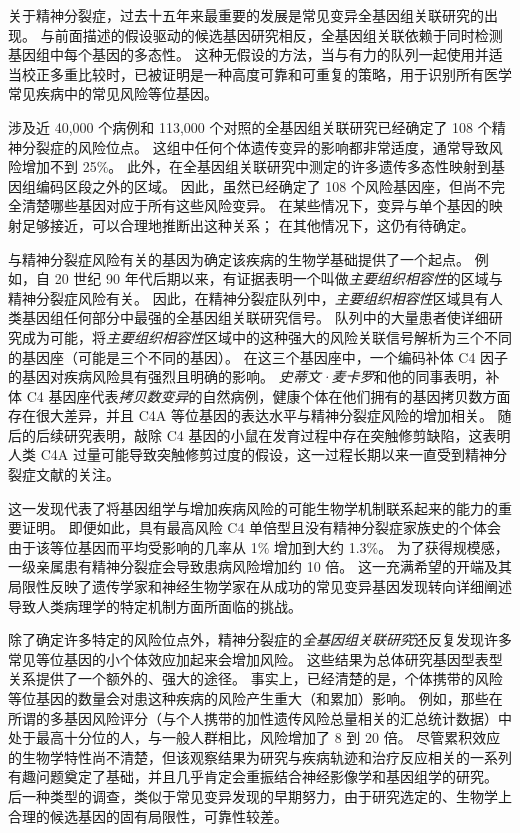 关于精神分裂症，过去十五年来最重要的发展是常见变异全基因组关联研究的出现。
与前面描述的假设驱动的候选基因研究相反，全基因组关联依赖于同时检测基因组中每个基因的多态性。
这种无假设的方法，当与有力的队列一起使用并适当校正多重比较时，已被证明是一种高度可靠和可重复的策略，用于识别所有医学常见疾病中的常见风险等位基因。


涉及近 40,000 个病例和 113,000 个对照的全基因组关联研究已经确定了 108 个精神分裂症的风险位点。 
这组中任何个体遗传变异的影响都非常适度，通常导致风险增加不到 25\%。
此外，在全基因组关联研究中测定的许多遗传多态性映射到基因组编码区段之外的区域。
因此，虽然已经确定了 108 个风险基因座，但尚不完全清楚哪些基因对应于所有这些风险变异。
在某些情况下，变异与单个基因的映射足够接近，可以合理地推断出这种关系；
在其他情况下，这仍有待确定。


与精神分裂症风险有关的基因为确定该疾病的生物学基础提供了一个起点。
例如，自 20 世纪 90 年代后期以来，有证据表明一个叫做\textit{主要组织相容性}的区域与精神分裂症风险有关。
因此，在精神分裂症队列中，\textit{主要组织相容性}区域具有人类基因组任何部分中最强的全基因组关联研究信号。
队列中的大量患者使详细研究成为可能，将\textit{主要组织相容性}区域中的这种强大的风险关联信号解析为三个不同的基因座（可能是三个不同的基因）。
在这三个基因座中，一个编码补体 C4 因子的基因对疾病风险具有强烈且明确的影响。
\textit{史蒂文·麦卡罗}和他的同事表明，补体 C4 基因座代表\textit{拷贝数变异}的自然病例，健康个体在他们拥有的基因拷贝数方面存在很大差异，并且 C4A 等位基因的表达水平与精神分裂症风险的增加相关。
随后的后续研究表明，敲除 C4 基因的小鼠在发育过程中存在突触修剪缺陷，这表明人类 C4A 过量可能导致突触修剪过度的假设，这一过程长期以来一直受到精神分裂症文献的关注。


这一发现代表了将基因组学与增加疾病风险的可能生物学机制联系起来的能力的重要证明。
即便如此，具有最高风险 C4 单倍型且没有精神分裂症家族史的个体会由于该等位基因而平均受影响的几率从 1\% 增加到大约 1.3\%。
为了获得规模感，一级亲属患有精神分裂症会导致患病风险增加约 10 倍。
这一充满希望的开端及其局限性反映了遗传学家和神经生物学家在从成功的常见变异基因发现转向详细阐述导致人类病理学的特定机制方面所面临的挑战。


除了确定许多特定的风险位点外，精神分裂症的\textit{全基因组关联研究}还反复发现许多常见等位基因的小个体效应加起来会增加风险。
这些结果为总体研究基因型表型关系提供了一个额外的、强大的途径。
事实上，已经清楚的是，个体携带的风险等位基因的数量会对患这种疾病的风险产生重大（和累加）影响。
例如，那些在所谓的多基因风险评分（与个人携带的加性遗传风险总量相关的汇总统计数据）中处于最高十分位的人，与一般人群相比，风险增加了 8 到 20 倍。
尽管累积效应的生物学特性尚不清楚，但该观察结果为研究与疾病轨迹和治疗反应相关的一系列有趣问题奠定了基础，并且几乎肯定会重振结合神经影像学和基因组学的研究。
后一种类型的调查，类似于常见变异发现的早期努力，由于研究选定的、生物学上合理的候选基因的固有局限性，可靠性较差。


